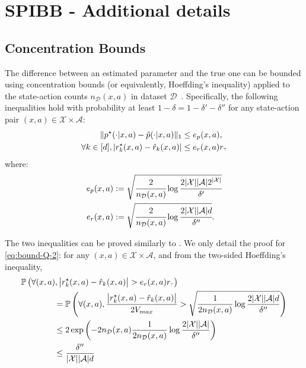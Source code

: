 \section{SPIBB - Additional details}
\label{app:spibb-additional-details}  
\subsection{Concentration Bounds} 
\label{app:error_bounds}

The difference between an estimated parameter and the true one can be bounded using concentration bounds (or equivalently, Hoeffding's inequality) applied to the state-action counts $n_{\mathcal{D}}(x,a)$ in dataset $\mathcal{D}$~\citep{petrik2016safe, laroche2017safe}. Specifically, the following inequalities hold with probability at least $1-\delta = 1 - \delta' - \delta''$ for any state-action pair $(x,a) \in \mathcal{X} \times \mathcal{A}$:
\begin{align}
	\lVert p^\star(\cdot|x,a)-\hat{p}(\cdot|x,a)\rVert_1 &\leq e_p(x,a),\\
	\forall k\in[d], \lvert r^\star_k(x,a)-\hat{r}_k(x,a)\rvert &\leq e_r(x,a)r_{\mytop} \label{eq:bound-Q-2}
\end{align}
where: 
\begin{align}
    e_p(x,a) &:= \sqrt{\cfrac{2}{n_{\mathcal{D}}(x,a)}\log\cfrac{2|\mathcal{X}||\mathcal{A}|2^{|\mathcal{X}|}}{\delta'}} \label{eq:error-function-P-2} \\
    e_r(x,a) &:= \sqrt{\cfrac{2}{n_{\mathcal{D}}(x,a)}\log\cfrac{2|\mathcal{X}||\mathcal{A}|d}{\delta''}}. \label{eq:error-function-Q-2}
\end{align}

    The two inequalities can be proved similarly to \citep[Proposition 9]{petrik2016safe}. We only detail the proof for \eqref{eq:bound-Q-2}: for any $(x,a) \in \mathcal{X} \times \mathcal{A}$, and from the two-sided Hoeffding's inequality, 
    \begin{align*}
        &\mathbb{P} \left( \forall (x,a), \big\lvert r^\star_k(x,a) -\hat{r}_k(x,a) \big\rvert > e_r(x,a)r_{\mytop} \right) 
        \\
        &\qquad\qquad = \mathbb{P} \left( \forall (x,a), \frac{\big\lvert r^\star_k(x,a)-\hat{r}_k(x,a) \big\rvert}{2 V_{max}} > \sqrt{\frac{1}{2 n_\mathcal{D}(x,a)} \log \frac{2 |\mathcal{X}||\mathcal{A}|d}{\delta''}} \right) \\
        &\qquad\qquad \leq 2 \exp \left( -2 n_\mathcal{D}(x,a) \frac{1}{2 n_\mathcal{D}(x,a)} \log \frac{2 |\mathcal{X}||\mathcal{A}|}{\delta''}  \right) \\
        &\qquad\qquad \leq \frac{\delta''}{| \mathcal{X} | | \mathcal{A} | d}
    \end{align*}
    
